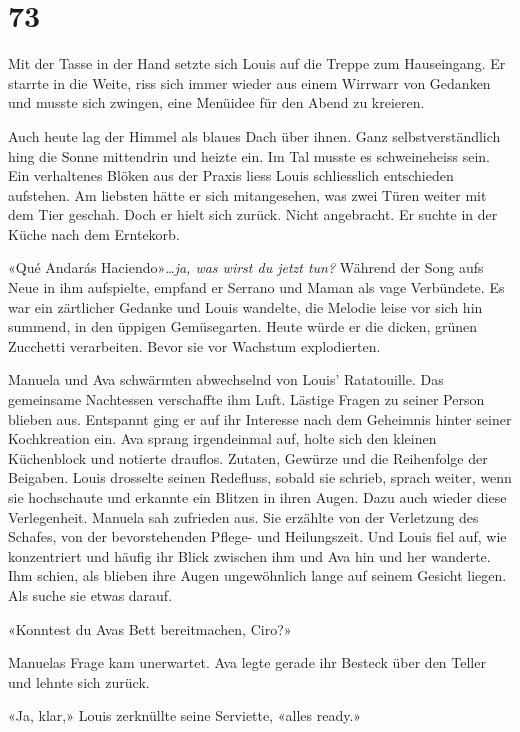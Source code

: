  \chapter{73}



Mit der Tasse in der Hand setzte sich Louis auf die Treppe zum Hauseingang. Er starrte in die Weite, riss sich immer wieder aus einem Wirrwarr von Gedanken und musste sich zwingen, eine Menüidee für den Abend zu kreieren.

Auch heute lag der Himmel als blaues Dach über ihnen. Ganz
selbstverständlich hing die Sonne mittendrin und heizte ein. Im Tal
musste es schweineheiss sein. Ein verhaltenes Blöken aus der Praxis liess Louis schliesslich
entschieden aufstehen. Am liebsten hätte er sich mitangesehen, was zwei
Türen weiter mit dem Tier geschah. Doch er hielt sich zurück. Nicht
angebracht. Er suchte in der Küche nach dem Erntekorb.

«Qué Andarás Haciendo»\ldots{}\emph{ja, was wirst du jetzt tun?} 
Während der Song aufs Neue in ihm aufspielte, empfand er Serrano und Maman als vage Verbündete. 
Es war ein zärtlicher Gedanke und Louis wandelte, die Melodie leise vor sich hin summend, in
den üppigen Gemüsegarten. Heute würde er die dicken, grünen Zucchetti verarbeiten. Bevor sie vor Wachstum explodierten.

\sectionbreak

Manuela und Ava schwärmten abwechselnd von Louis’ Ratatouille. Das
gemeinsame Nachtessen verschaffte ihm Luft. Lästige Fragen zu seiner
Person blieben aus. Entspannt ging er auf ihr Interesse nach dem
Geheimnis hinter seiner Kochkreation ein. Ava sprang irgendeinmal auf,
holte sich den kleinen Küchenblock und notierte drauflos. Zutaten,
Gewürze und die Reihenfolge der Beigaben. Louis drosselte seinen
Redefluss, sobald sie schrieb, sprach weiter, wenn sie hochschaute und
erkannte ein Blitzen in ihren Augen. Dazu auch wieder diese Verlegenheit.
Manuela sah zufrieden aus. Sie erzählte von der Verletzung des Schafes, 
von der bevorstehenden Pflege- und Heilungszeit. Und Louis fiel auf, wie
konzentriert und häufig ihr Blick zwischen ihm und Ava hin und her
wanderte. Ihm schien, als blieben ihre Augen ungewöhnlich lange auf
seinem Gesicht liegen. Als suche sie etwas darauf.

«Konntest du Avas Bett bereitmachen, Ciro?» 

Manuelas Frage kam unerwartet. Ava legte gerade ihr Besteck
über den Teller und lehnte sich zurück.

«Ja, klar,» Louis zerknüllte seine Serviette, «alles ready.»

